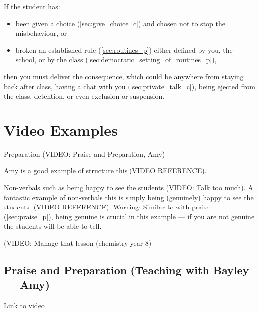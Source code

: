 \documentclass[12pt]{report}
\begin{document}
If the student has:
\begin{itemize}
  \item been given a choice (\ref{sec:give_choice_c}) and chosen not to stop the misbehaviour, or 
  \item broken an established rule (\ref{sec:routines_p}) either defined by you, the school, or by the class (\ref{sec:democratic_setting_of_routines_p}), 
\end{itemize}
then you must deliver the consequence, which could be anywhere from staying back after class, having a chat with you (\ref{sec:private_talk_c}), being ejected from the class, detention, or even exclusion or suspension.














\chapter{Video Examples}
\label{chap:video_examples}

Preparation (VIDEO: Praise and Preparation, Amy)

 Amy is a good example of structure this (VIDEO REFERENCE).

Non-verbals such as being happy to see the students (VIDEO: Talk too much).
A fantastic example of non-verbals this is simply being (genuinely) happy to see the students.
(VIDEO REFERENCE). Warning: Similar to with praise (\ref{sec:praise_p}), being genuine is crucial in this example --- if you are not genuine the students will be able to tell.



 (VIDEO: Manage that lesson (chemistry year 8)


\section{Praise and Preparation (Teaching with Bayley --- Amy)}

\href{https://youtu.be/KkXRjrSsMQg}{Link to video}


% 
\end{document}
